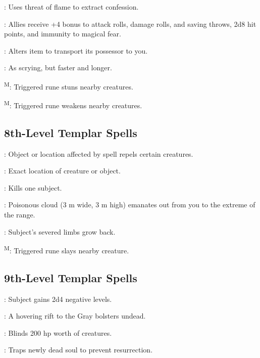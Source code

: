 : Uses threat of flame to extract confession.

: Allies receive +4 bonus to attack rolls, damage rolls, and saving throws, 2d8 hit points, and immunity to magical fear.

: Alters item to transport its possessor to you.

: As scrying, but faster and longer.

\textsuperscript{M}: Triggered rune stuns nearby creatures.

\textsuperscript{M}: Triggered rune weakens nearby creatures.



\subsection{8th-Level Templar Spells}

: Object or location affected by spell repels certain creatures.

: Exact location of creature or object.

: Kills one subject.

: Poisonous cloud (3 m wide, 3 m high) emanates out from you to the extreme of the range.

: Subject's severed limbs grow back.

\textsuperscript{M}: Triggered rune slays nearby creature.



\subsection{9th-Level Templar Spells}

: Subject gains 2d4 negative levels.

: A hovering rift to the Gray bolsters
undead.

: Blinds 200 hp worth of creatures.

: Traps newly dead soul to prevent
resurrection.